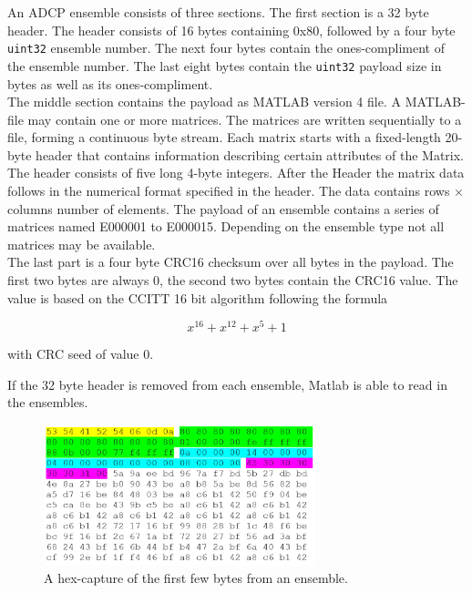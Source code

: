 An ADCP ensemble consists of three sections. The first section is a 32 byte header. The header consists of 16 bytes containing 0x80, followed by a four byte \texttt{uint32} ensemble number. The next four bytes contain the ones-compliment of the ensemble number. The last eight bytes contain the \texttt{uint32} payload size in bytes as well as its ones-compliment.\\
The middle section contains the payload as MATLAB version 4 file. A MATLAB-file may contain one or more matrices. The matrices are written sequentially to a file,  forming a continuous byte stream. Each matrix starts with a fixed-length 20-byte header that contains information describing certain attributes of the Matrix. The header consists of five long 4-byte integers. After the Header the matrix data follows in the numerical format specified in the header. The data contains rows $\times$ columns number of elements.
The payload of an ensemble contains a series of matrices named E000001 to E000015. Depending on the ensemble type not all matrices may be available.\\
The last part is a four byte CRC16 checksum over all bytes in the payload. The first two bytes are always 0, the second two bytes contain the CRC16 value. The value is based on the CCITT 16 bit algorithm following the formula 

$$ x^{16} + x^{12} + x^5 +1$$

with CRC seed of value 0.

If the 32 byte header is removed from each ensemble, Matlab is able to read in the ensembles.
\begin{figure}[h]
\centering
      \includegraphics[width=0.7\textwidth]{hexdump}
        \caption{A hex-capture of the first few bytes from an ensemble.}
\end{figure}


